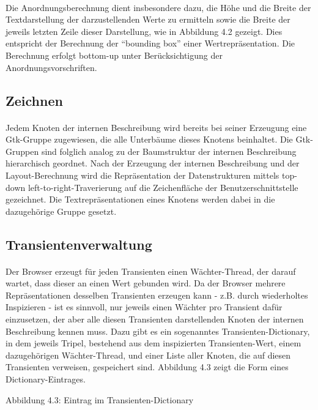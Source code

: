 \documentclass[12pt,a4paper]{article}
\begin{document}
\paragraph{}

Die Anordnungsberechnung dient insbesondere 
dazu, die H\"{o}he und die Breite 
der Textdarstellung der darzustellenden Werte 
zu ermitteln sowie die Breite der jeweils 
letzten Zeile dieser Darstellung, wie in 
Abbildung 4.2 gezeigt. Dies 
entspricht der Berechnung der ``bounding box'' \cite{br:oz} 
einer Wertrepr\"{a}sentation. Die 
Berechnung erfolgt bottom-up unter Ber\"{u}cksichtigung 
der Anordnungsvorschriften.  

\subsection{Zeichnen}

\paragraph{}

Jedem Knoten der internen Beschreibung wird bereits bei seiner  
Erzeugung eine Gtk-Gruppe zugewiesen, 
die alle Unterb\"aume dieses Knotens beinhaltet. Die Gtk-Gruppen sind 
folglich  analog zu der Baumstruktur der internen Beschreibung hierarchisch 
geordnet. 
Nach der Erzeugung der internen Beschreibung und der Layout-Berechnung 
wird die Repr\"asentation der Datenstrukturen mittels top-down 
left-to-right-Traverierung auf die Zeichenfl\"ache der 
Benutzerschnittstelle gezeichnet. Die Textrepr\"asentationen eines 
Knotens werden dabei in die dazugeh\"orige Gruppe gesetzt. 


\subsection{Transientenverwaltung}

\paragraph{}

Der Browser erzeugt f\"ur jeden Transienten einen W\"achter-Thread, 
der darauf wartet, dass dieser an einen Wert gebunden
wird. Da der Browser mehrere Repr\"asentationen desselben 
Transienten erzeugen kann - z.B. durch wiederholtes Inspizieren - 
ist es sinnvoll, nur jeweils einen W\"achter pro Transient daf\"ur 
einzusetzen, der aber alle diesen Transienten darstellenden Knoten der 
internen Beschreibung kennen muss.
Dazu gibt es ein sogenanntes Transienten-Dictionary, in dem 
jeweils Tripel, bestehend aus dem inspizierten Transienten-Wert, 
einem dazugeh\"origen W\"achter-Thread, und einer 
Liste aller Knoten, die auf diesen Transienten verweisen, 
gespeichert sind. Abbildung 4.3 zeigt die Form eines 
Dictionary-Eintrages.
\begin{center}
\newline Abbildung 4.3: Eintrag im Transienten-Dictionary
\end{center}
\end{document}
